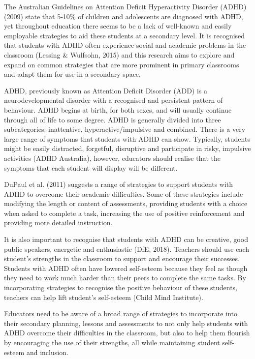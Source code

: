 \documentclass[twoside,12pt,a4paper,notitlepage]{memoir}
\begin{document}
The Australian Guidelines on Attention Deficit Hyperactivity Disorder (ADHD) (2009) state that 5-10\% of children and adolescents are diagnosed with ADHD, yet throughout education there seems to be a lack of well-known and easily employable strategies to aid these students at a secondary level. It is recognised that students with ADHD often experience social and academic problems in the classroom (Lessing \& Wulfsohn, 2015) and this research aims to explore and expand on common strategies that are more prominent in primary classrooms and adapt them for use in a secondary space.

ADHD, previously known as Attention Deficit Disorder (ADD) is a neurodevelopmental disorder with a recognised and persistent pattern of behaviour. ADHD begins at birth, for both sexes, and will usually continue through all of life to some degree. ADHD is generally divided into three subcategories: inattentive, hyperactive/impulsive and combined. There is a very large range of symptoms that students with ADHD can show. Typically, students might be easily distracted, forgetful, disruptive and participate in risky, impulsive activities (ADHD Australia), however, educators should realise that the symptoms that each student will display will be different.

DuPaul et al. (2011) suggests a range of strategies to support students with ADHD to overcome their academic difficulties. Some of these strategies include modifying the length or content of assessments, providing students with a choice when asked to complete a task, increasing the use of positive reinforcement and providing more detailed instruction.

It is also important to recognise that students with ADHD can be creative, good public speakers, energetic and enthusiastic (DfE, 2018). Teachers should use each student’s strengths in the classroom to support and encourage their successes. Students with ADHD often have lowered self-esteem because they feel as though they need to work much harder than their peers to complete the same tasks. By incorporating strategies to recognise the positive behaviour of these students, teachers can help lift student’s self-esteem (Child Mind Institute).

Educators need to be aware of a broad range of strategies to incorporate into their secondary planning, lessons and assessments to not only help students with ADHD overcome their difficulties in the classroom, but also to help them flourish by encouraging the use of their strengths, all while maintaining student self-esteem and inclusion.
\end{document}
